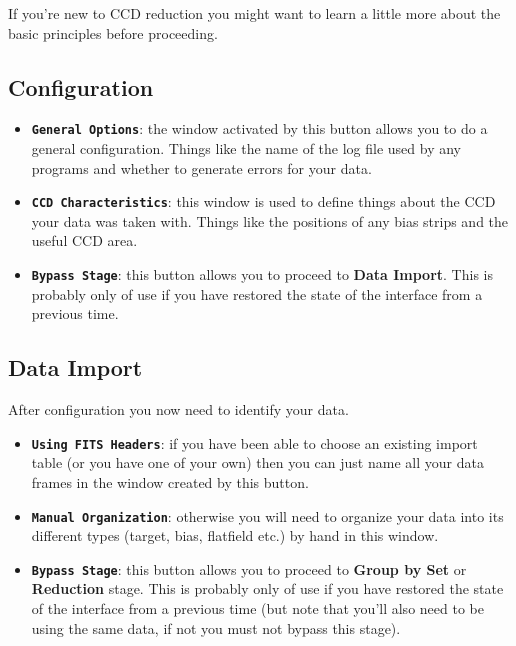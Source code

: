 \documentclass[11pt]{article}
\newcommand{\htmlref}[2]{#1}
\newcommand{\xref}[3]{#1}
\newcommand{\xlabel}[1]{}
\newcommand{\butt}[1]{{\bf \tt #1}}
\newcommand{\wlab}[1]{{\bf #1}}
\begin{document}
If you're new to CCD reduction you might want to learn a little more 
about the \xref{basic principles}{sun139}{CCDprinciples} before 
proceeding.

\subsection{Configuration \xlabel{CCDMainConfiguration}}
\begin{itemize}
\item \butt{General Options}: the window activated by this button
allows you to do a general configuration. Things like the name of the
log file used by any programs and whether to generate errors for your
data.
\item \butt{CCD Characteristics}: this window is used to define things
about the CCD your data was taken with. Things like the positions of
any bias strips and the useful CCD area.
\item \butt{Bypass Stage}: this button allows you to proceed to
\wlab{Data Import}. This is probably only of use if you have
\htmlref{restored the state}{CCDMainMenu}
 of the interface from a previous time.
\end{itemize}

\subsection{Data Import \xlabel{CCDMainDataImport}}
After configuration you now need to identify your data.
\begin{itemize}
\item \butt{Using FITS Headers}:
if you have been able to choose an existing import table (or you have
one of your own) then you can just name all your data frames in the
window created by this button.
\item \butt{Manual Organization}:
otherwise you will need to organize your data into its different types
(target, bias, flatfield etc.) by hand in this window.
\item \butt{Bypass Stage}: this button allows you to proceed to
\wlab{Group by Set} or \wlab{Reduction} stage.
This is probably only of use if you have
\htmlref{restored the state}{CCDMainMenu}
of the interface from a previous time (but note that you'll also need to be
using the same data, if not you must not bypass this stage).
\end{itemize}
\end{document}
